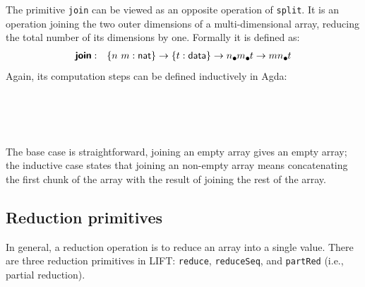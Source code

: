 \documentclass{l4proj}
\begin{document}
The primitive \texttt{join} can be viewed as an opposite operation of \texttt{split}. It is an operation joining the two outer dimensions of a multi-dimensional array, reducing the total number of its dimensions by one. Formally it is defined as:
\begin{align}
    \prim{join}&:&\{\n~\m : \natkind\} \to \{\dt : \datatype\} \to \lArray{\n}{\lArray{\m}{\dt}} \to \lArray{\m\n}{\dt}
\end{align}
Again, its computation steps can be defined inductively in Agda:
\begin{code}%
\>[0]\<%
\\
\>[0]\AgdaSpace{}%
\AgdaSymbol{:}\AgdaSpace{}%
\AgdaSymbol{\{}\AgdaSpace{}%
\AgdaSpace{}%
\AgdaSymbol{:}\AgdaSpace{}%
\AgdaSymbol{\}}\AgdaSpace{}%
\AgdaSpace{}%
\AgdaSymbol{\{}\AgdaSpace{}%
\AgdaSymbol{:}\AgdaSpace{}%
\AgdaSymbol{\}}\AgdaSpace{}%
\AgdaSpace{}%
\AgdaSpace{}%
\AgdaSymbol{(}\AgdaSpace{}%
\AgdaSpace{}%
\AgdaSymbol{)}\AgdaSpace{}%
\AgdaSpace{}%
\AgdaSpace{}%
\AgdaSpace{}%
\AgdaSpace{}%
\AgdaSymbol{(}\AgdaSpace{}%
\AgdaOperator{\AgdaPrimitive{*}}\AgdaSpace{}%
\AgdaSymbol{)}\<%
\\
\>[0]\AgdaSpace{}%
\AgdaInductiveConstructor{[]}\AgdaSpace{}%
\AgdaSymbol{=}\AgdaSpace{}%
\AgdaInductiveConstructor{[]}\<%
\\
\>[0]\AgdaSpace{}%
\AgdaSymbol{(}\AgdaSpace{}%
\AgdaSpace{}%
\AgdaSymbol{)}\AgdaSpace{}%
\AgdaSymbol{=}\AgdaSpace{}%
\AgdaSpace{}%
\AgdaOperator{\AgdaFunction{++}}\AgdaSpace{}%
\AgdaSpace{}%
\<%
\end{code}
The base case is straightforward, joining an empty array gives an empty array; the inductive case states that joining an non-empty array means concatenating the first chunk of the array with the result of joining the rest of the array.

\subsection{Reduction primitives}
\label{prim:red}
In general, a reduction operation is to reduce an array into a single value. There are three reduction primitives in LIFT: \texttt{reduce}, \texttt{reduceSeq}, and \texttt{partRed} (i.e., partial reduction). 
\end{document}
